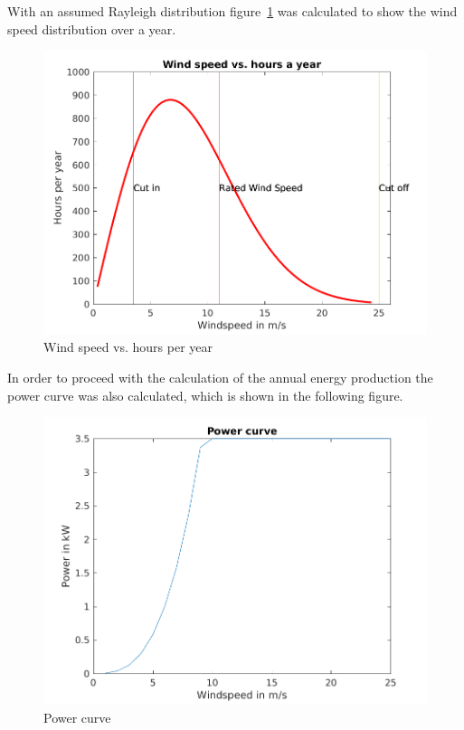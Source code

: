\documentclass[10pt]{article}
\begin{document}
With an assumed Rayleigh distribution figure~\ref{fig:ws} was calculated to show the wind speed distribution over a year.

\begin{figure}[H]
\includegraphics[width=1\linewidth]{../CIP_1/ws_plot.png}
\caption{Wind speed vs. hours per year}
\label{fig:ws}
\end{figure}
In order to proceed with the calculation of the annual energy production the power curve was also calculated, which is shown in the following figure.

\begin{figure}[H]
\includegraphics[width=1\linewidth]{../CIP_1/power_curve.png}
\caption{Power curve}
\label{fig:power}
\end{figure}
\end{document}
